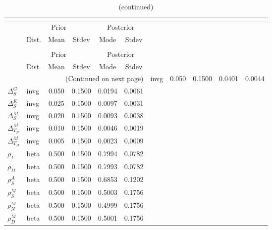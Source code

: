  
\begin{center}
\begin{longtable}{llcccc} 
\caption{Results from posterior maximization (parameters)}\\
 \label{Table:Posterior:1}\\
\toprule 
  & \multicolumn{3}{c}{Prior}  &  \multicolumn{2}{c}{Posterior} \\
  \cmidrule(r{.75em}){2-4} \cmidrule(r{.75em}){5-6}
  & Dist. & Mean  & Stdev & Mode & Stdev \\ 
\midrule \endfirsthead 
\caption{(continued)}\\
 \bottomrule 
  & \multicolumn{3}{c}{Prior}  &  \multicolumn{2}{c}{Posterior} \\
  \cmidrule(r{.75em}){2-4} \cmidrule(r{.75em}){5-6}
  & Dist. & Mean  & Stdev & Mode & Stdev \\ 
\midrule \endhead 
\bottomrule \multicolumn{6}{r}{(Continued on next page)}\endfoot 
\bottomrule\endlastfoot 
${\Delta^{A}_{S}}$ & invg &   0.050 & 0.1500 &   0.0401 &  0.0044 \\ 
${\Delta^{G}_{S}}$ & invg &   0.050 & 0.1500 &   0.0194 &  0.0061 \\ 
${\Delta^{K}_{S}}$ & invg &   0.025 & 0.1500 &   0.0097 &  0.0031 \\ 
${\Delta^{M}_{S}}$ & invg &   0.020 & 0.1500 &   0.0093 &  0.0038 \\ 
${\Delta^{M}_{T_N}}$ & invg &   0.010 & 0.1500 &   0.0046 &  0.0019 \\ 
${\Delta^{M}_{T_D}}$ & invg &   0.005 & 0.1500 &   0.0023 &  0.0009 \\ 
${\rho_{I}}$ & beta &   0.500 & 0.1500 &   0.7994 &  0.0782 \\ 
${\rho_{II}}$ & beta &   0.500 & 0.1500 &   0.7993 &  0.0782 \\ 
${\rho^{A}_{S}}$ & beta &   0.500 & 0.1500 &   0.6853 &  0.1202 \\ 
${\rho^{M}_{S}}$ & beta &   0.500 & 0.1500 &   0.5003 &  0.1756 \\ 
${\rho^{M}_{N}}$ & beta &   0.500 & 0.1500 &   0.4999 &  0.1756 \\ 
${\rho^{M}_{D}}$ & beta &   0.500 & 0.1500 &   0.5001 &  0.1756 \\ 
\end{longtable}
 \end{center}
